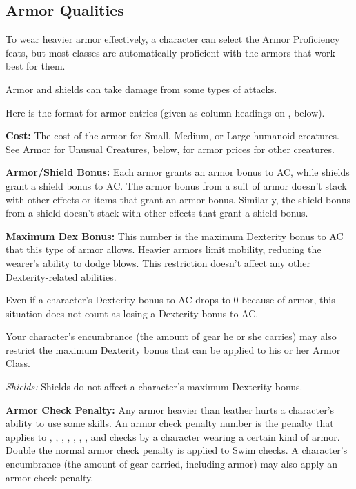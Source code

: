 \subsection{Armor Qualities}
To wear heavier armor effectively, a character can select the Armor Proficiency feats, but most classes are automatically proficient with the armors that work best for them.

Armor and shields can take damage from some types of attacks.

Here is the format for armor entries (given as column headings on , below).

\textbf{Cost:} The cost of the armor for Small, Medium, or Large humanoid creatures. See Armor for Unusual Creatures, below, for armor prices for other creatures.

\textbf{Armor/Shield Bonus:} Each armor grants an armor bonus to AC, while shields grant a shield bonus to AC. The armor bonus from a suit of armor doesn't stack with other effects or items that grant an armor bonus. Similarly, the shield bonus from a shield doesn't stack with other effects that grant a shield bonus.

\textbf{Maximum Dex Bonus:} This number is the maximum Dexterity bonus to AC that this type of armor allows. Heavier armors limit mobility, reducing the wearer's ability to dodge blows. This restriction doesn't affect any other Dexterity-related abilities.

Even if a character's Dexterity bonus to AC drops to 0 because of armor, this situation does not count as losing a Dexterity bonus to AC.

Your character's encumbrance (the amount of gear he or she carries) may also restrict the maximum Dexterity bonus that can be applied to his or her Armor Class.

\textit{Shields:} Shields do not affect a character's maximum Dexterity bonus.

\textbf{Armor Check Penalty:} Any armor heavier than leather hurts a character's ability to use some skills. An armor check penalty number is the penalty that applies to , , , , , , , and  checks by a character wearing a certain kind of armor. Double the normal armor check penalty is applied to Swim checks. A character's encumbrance (the amount of gear carried, including armor) may also apply an armor check penalty.

